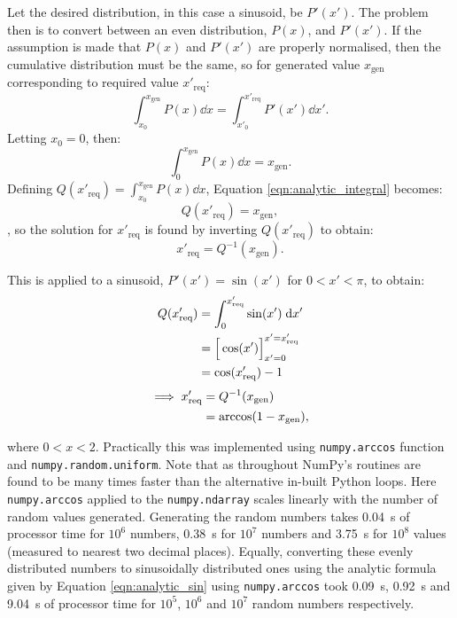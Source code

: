 Let the desired distribution, in this case a sinusoid, be $P'(x')$. The problem then is to convert between an even distribution, $P(x)$, and $P'(x')$. If the assumption is made that $P(x)$ and $P'(x')$ are properly normalised, then the cumulative distribution must be the same, so for generated value $x_{\text{gen}}$ corresponding to required value $x'_{\text{req}}$:
\begin{equation}
    \int_{x_0}^{x_{\text{gen}}} P(x) \dd x = \int_{x'_0}^{x'_{\text{req}}} P'(x') \dd x'.
    \label{eqn:analytic_integral}
\end{equation}
Letting $x_0 = 0$, then:
\begin{equation}
    \int_0^{x_{\text{gen}}} P(x) \dd x = x_{\text{gen}}.
\end{equation}
Defining $Q(x'_{\text{req}}) = \int_{x_0}^{x_{\text{gen}}} P(x) \dd x$, Equation \ref{eqn:analytic_integral} becomes:
\begin{equation}
    Q(x'_{\text{req}}) = x_{\text{gen}},
    \label{eqn:analytic_q}
\end{equation}, so the solution for $x'_{\text{req}}$ is found by inverting $Q(x'_{\text{req}})$ to obtain:
\begin{equation}
    x'_{\text{req}} = Q^{-1}(x_{\text{gen}}).
\end{equation}

This is applied to a sinusoid, $P'(x') = \sin(x')$ for $0 < x' < \pi$, to obtain:
\begin{align}
    Q(x'_{\text{req}}) &= \int_0^{x'_{\text{req}}} \sin(x') \; \mathrm{d} x' \notag \\
                       &= \Big[\cos(x')\Big]_{x' = 0}^{x' = x'_{\text{req}}} \label{eqn:analytic_sin} \\
                       &= \cos(x'_{\text{req}}) - 1 \notag 
\end{align}
\begin{align}
    \implies x'_{\text{req}} &= Q^{-1}(x_{\text{gen}}) \notag \\
                             &= \arccos(1 - x_{\text{gen}}), \label{eqn:analytic_sin_inverted}
\end{align} 

where $0 < x < 2$. Practically this was implemented using \texttt{numpy.arccos} function and \texttt{numpy.random.uniform}. Note that as throughout NumPy's routines are found to be many times faster than the alternative in-built Python loops. Here \texttt{numpy.arccos} applied to the \texttt{numpy.ndarray} scales linearly with the number of random values generated. Generating the random numbers takes \SI{0.04}{\second} of processor time for $10^6$ numbers, \SI{0.38}{\second} for $10^7$ numbers and \SI{3.75}{\second} for $10^8$ values (measured to nearest two decimal places). Equally, converting these evenly distributed numbers to sinusoidally distributed ones using the analytic formula given by Equation \ref{eqn:analytic_sin} using \texttt{numpy.arccos} took \SI{0.09}{\second}, \SI{0.92}{\second} and \SI{9.04}{\second} of processor time for $10^5$, $10^6$ and $10^7$ random numbers respectively.

